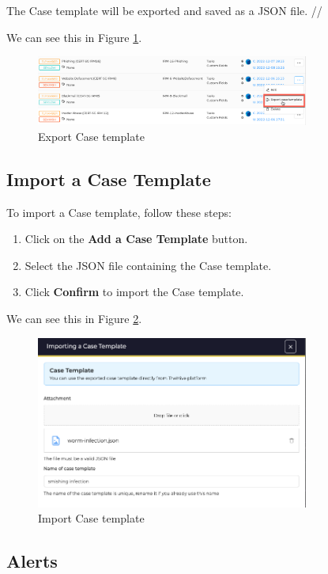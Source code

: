 \documentclass{article}
\begin{document}
The Case template will be exported and saved as a JSON file. //

We can see this in Figure \ref{fig:export}.
\begin{figure}[h!]
    \centering
    \includegraphics[width=0.8\textwidth]{organisation-case-templates-3.png}
    \caption{Export Case template}
    \label{fig:export}
\end{figure}

\subsection*{Import a Case Template}

To import a Case template, follow these steps:

\begin{enumerate}
  \item Click on the \textbf{Add a Case Template} button.
  \item Select the JSON file containing the Case template.
  \item Click \textbf{Confirm} to import the Case template.
\end{enumerate}

We can see this in Figure \ref{fig:import}.
\begin{figure}[H]
    \centering
    \includegraphics[width=0.8\textwidth]{organisastion-case-templates-4.png}
    \caption{Import Case template}
    \label{fig:import}
\end{figure}

\subsection{Alerts}
\end{document}
